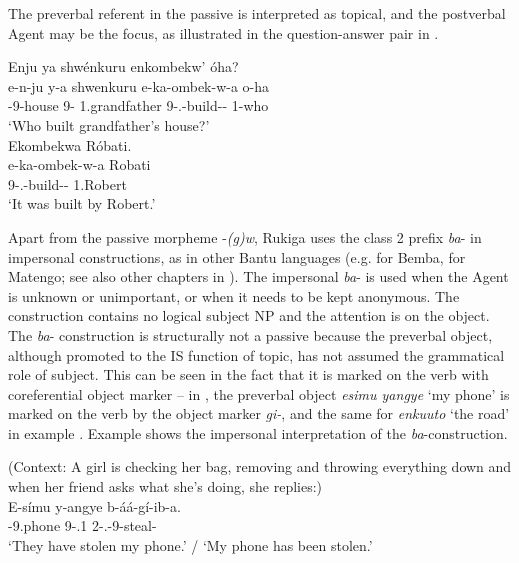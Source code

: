 \documentclass[output=paper]{langscibook}
\begin{document}
\z
\z


The preverbal referent in the passive is interpreted as topical, and the postverbal Agent may be the focus, as illustrated in the question-answer pair in .

\ea
\label{bkm:Ref111462190}
\ea
Enju ya shwénkuru enkombekw’ óha?\\
\gll
e-n-ju  y-a  shwenkuru  e-ka-ombek-w-a  o-ha\\
\AUG{}-9-house  9-\CONN{}  1.grandfather  9\SM{}-\F{}.\PST{}-build-\PASS{}-\FV{}  1-who\\
\glt
‘Who built grandfather’s house?’\\


\ex
Ekombekwa Róbati.\\
\gll
e-ka-ombek-w-a  Robati\\
9\SM{}-\F{}.\PST{}-build-\PASS{}-\FV{}  1.Robert\\
\glt
‘It was built by Robert.’\\


\z
\z

Apart from the passive morpheme -\textit{(g)w}, Rukiga uses the class 2 prefix \textit{ba}- in impersonal constructions, as in other Bantu languages (e.g. \citealt{KulaMarten2010} for Bemba, \citealt{vanderWal2016} for Matengo; see also other chapters in \citealt{langsci-current-book}). The impersonal \textit{ba}- is used when the Agent is unknown or unimportant, or when it needs to be kept anonymous. The construction contains no logical subject NP and the attention is on the object. The \textit{ba}- construction is structurally not a passive because the preverbal object, although promoted to the IS function of topic, has not assumed the grammatical role of subject. This can be seen in the fact that it is marked on the verb with coreferential object marker – in , the preverbal object \textit{esimu yangye} ‘my phone’ is marked on the verb by the object marker \textit{gi-}, and the same for \textit{enkuuto} ‘the road’ in example . Example  shows the impersonal interpretation of the \textit{ba}-construction.

\ea
\label{bkm:Ref113456530}
(Context: A girl is checking her bag, removing and throwing everything down and when her friend asks what she’s doing, she replies:)\\
\gll
E-símu  y-angye  b-áá-gí-ib-a.\\
\AUG{}-{}9.phone  9-\POSS{}.1\SG{}  2\SM{}-\N{}.\PST{}-9\OM{}-{}steal-\FV{}\\
\glt
‘They have stolen my phone.’ / ‘My phone has been stolen.’\\
\end{document}
